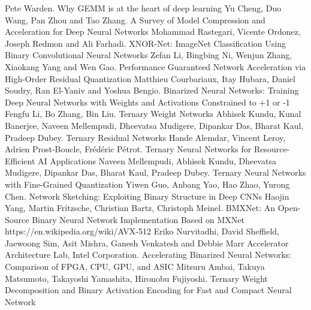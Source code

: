 \begin{thebibliography}{99}
 Pete Warden. Why GEMM is at the heart of deep learning
 Yu Cheng, Duo Wang, Pan Zhou and Tao Zhang. A Survey of Model Compression and Acceleration for Deep Neural Networks
 Mohammad Rastegari, Vicente Ordonez, Joseph Redmon and  Ali Farhadi. XNOR-Net: ImageNet Classification Using Binary Convolutional Neural Networks
 Zefan Li, Bingbing Ni, Wenjun Zhang, Xiaokang Yang and  Wen Gao. Performance Guaranteed Network Acceleration via High-Order Residual Quantization
 Matthieu Courbariaux, Itay Hubara, Daniel Soudry, Ran El-Yaniv and Yoshua Bengio. Binarized Neural Networks: Training Deep Neural Networks with Weights and Activations Constrained to +1 or -1
 Fengfu Li, Bo Zhang, Bin Liu. Ternary Weight Networks
 Abhisek Kundu, Kunal Banerjee, Naveen Mellempudi, Dheevatsa Mudigere, Dipankar Das, Bharat Kaul, Pradeep Dubey. Ternary Residual Networks
 Hande Alemdar, Vincent Leroy, Adrien Prost-Boucle, Frédéric Pétrot. Ternary Neural Networks for Resource-Efficient AI Applications
 Naveen Mellempudi, Abhisek Kundu, Dheevatsa Mudigere, Dipankar Das, Bharat Kaul, Pradeep Dubey. Ternary Neural Networks with Fine-Grained Quantization
 Yiwen Guo, Anbang Yao, Hao Zhao, Yurong Chen. Network Sketching: Exploiting Binary Structure in Deep CNNs
 Haojin Yang, Martin Fritzsche, Christian Bartz, Christoph Meinel. BMXNet: An Open-Source Binary Neural Network Implementation Based on MXNet
 https://en.wikipedia.org/wiki/AVX-512
 Eriko Nurvitadhi, David Sheffield, Jaewoong Sim, Asit Mishra, Ganesh Venkatesh and Debbie Marr Accelerator Architecture Lab, Intel Corporation. Accelerating Binarized Neural Networks:
Comparison of FPGA, CPU, GPU, and ASIC
Mitsuru Ambai, Takuya Matsumoto, Takayoshi Yamashita, Hironobu Fujiyoshi. Ternary Weight Decomposition and Binary Activation Encoding for Fast and Compact Neural Network





\end{thebibliography}


 
